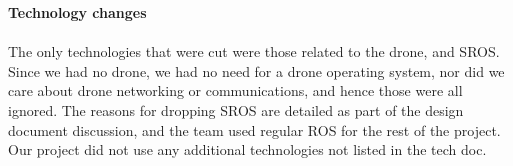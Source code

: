 \documentclass[IEEEtran,letterpaper,10pt,notitlepage,draftclsnofoot,onecolumn]{article}
\begin{document}
\LARGE\textbf{Technology changes\\\\}\normalsize
The only technologies that were cut were those related to the drone, and SROS.
Since we had no drone, we had no need for a drone operating system, nor did 
we care about drone networking or communications, and hence those were all 
ignored. The reasons for dropping SROS are detailed as part of the design 
document discussion, and the team used regular ROS for the rest of the project. 
Our project did not use any additional technologies not listed in the tech doc.
\end{document}
